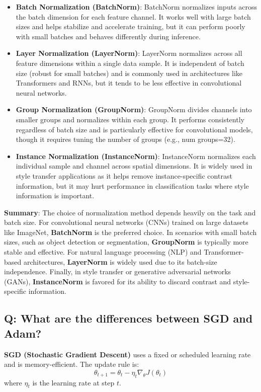 \begin{itemize}
	\item \textbf{Batch Normalization (BatchNorm)}: BatchNorm normalizes inputs across the batch dimension for each feature channel. It works well with large batch sizes and helps stabilize and accelerate training, but it can perform poorly with small batches and behaves differently during inference.

	\item \textbf{Layer Normalization (LayerNorm)}: LayerNorm normalizes across all feature dimensions within a single data sample. It is independent of batch size (robust for small batches) and is commonly used in architectures like Transformers and RNNs, but it tends to be less effective in convolutional neural networks.

	\item \textbf{Group Normalization (GroupNorm)}: GroupNorm divides channels into smaller groups and normalizes within each group. It performs consistently regardless of batch size and is particularly effective for convolutional models, though it requires tuning the number of groups (e.g., num groups=32).

	\item \textbf{Instance Normalization (InstanceNorm)}: InstanceNorm normalizes each individual sample and channel across spatial dimensions. It is widely used in style transfer applications as it helps remove instance-specific contrast information, but it may hurt performance in classification tasks where style information is important.
\end{itemize}

\textbf{Summary}: The choice of normalization method depends heavily on the task and batch size. For convolutional neural networks (CNNs) trained on large datasets like ImageNet, \textbf{BatchNorm} is the preferred choice. In scenarios with small batch sizes, such as object detection or segmentation, \textbf{GroupNorm} is typically more stable and effective. For natural language processing (NLP) and Transformer-based architectures, \textbf{LayerNorm} is widely used due to its batch-size independence. Finally, in style transfer or generative adversarial networks (GANs), \textbf{InstanceNorm} is favored for its ability to discard contrast and style-specific information.

\subsection*{\textcolor{primaryteal}{Q: What are the differences between SGD and Adam?}}
\textbf{SGD (Stochastic Gradient Descent)} uses a fixed or scheduled learning rate and is memory-efficient. The update rule is:
\[
	\theta_{t+1} = \theta_t - \eta_t \nabla_\theta J(\theta_t)
\]
where $\eta_t$ is the learning rate at step $t$.

